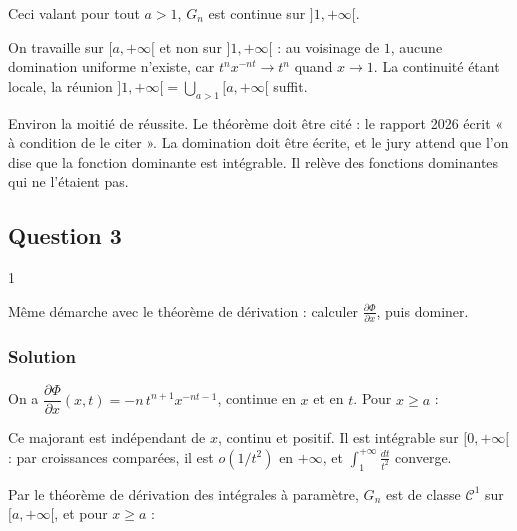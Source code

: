\documentclass[11pt,a4paper]{article}
\newcommand{\equationajustee}[1]{%
  \sbox{\boiteequation}{$\displaystyle #1$}%
  \ifdim\wd\boiteequation>\linewidth
    \[\resizebox{\linewidth}{!}{\usebox{\boiteequation}}\]%
  \else
    \[#1\]%
  \fi}
\begin{document}
Ceci valant pour tout \(a>1\), \(G_n\) est continue sur \(]1,+\infty[\).

\begin{methode}

On travaille sur \([a,+\infty[\) et non sur \(]1,+\infty[\) : au voisinage de \(1\), aucune domination uniforme n'existe, car \(t^nx^{-nt}\to t^n\) quand \(x\to1\). La continuité étant locale, la réunion \(]1,+\infty[=\bigcup_{a>1}[a,+\infty[\) suffit.

\end{methode}

\begin{jury}

Environ la moitié de réussite. Le théorème doit être cité : le rapport 2026 écrit « à condition de le citer ». La domination doit être écrite, et le jury attend que l'on dise que la fonction dominante est intégrable. Il relève des fonctions dominantes qui ne l'étaient pas.

\end{jury}

\hypertarget{question-3-2}{%
\subsection{Question 3}\label{question-3-2}}

\begin{indication}{1}

Même démarche avec le théorème de dérivation : calculer \(\frac{\partial\Phi}{\partial x}\), puis dominer.

\end{indication}

\hypertarget{solution-21}{%
\subsubsection{Solution}\label{solution-21}}

On a \(\dfrac{\partial\Phi}{\partial x}(x,t)=-n\,t^{n+1}x^{-nt-1}\), continue en \(x\) et en \(t\). Pour \(x\ge a\) :

\equationajustee{\Big|\frac{\partial\Phi}{\partial x}(x,t)\Big|\le n\,t^{n+1}a^{-nt-1}.}

Ce majorant est indépendant de \(x\), continu et positif. Il est intégrable sur \([0,+\infty[\) : par croissances comparées, il est \(o(1/t^2)\) en \(+\infty\), et \(\int_1^{+\infty}\frac{dt}{t^2}\) converge.

Par le théorème de dérivation des intégrales à paramètre, \(G_n\) est de classe \(\mathcal C^1\) sur \([a,+\infty[\), et pour \(x\ge a\) :
\end{document}
